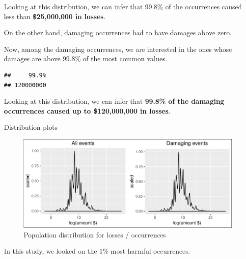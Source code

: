 \documentclass[]{article}
\begin{document}
Looking at this distribution, we can infer that 99.8\% of the
occurrences caused less than \textbf{\$25,000,000 in losses}.

On the other hand, damaging occurrences had to have damages above zero.

Now, among the damaging occurrences, we are interested in the ones whose
damages are above 99.8\% of the most common values.

\begin{verbatim}
##     99.9% 
## 120000000
\end{verbatim}

Looking at this distribution, we can infer that \textbf{99.8\% of the
damaging occurrences caused up to \$120,000,000 in losses}.

Distribution plots

\begin{figure}[h!]
\centering
\includegraphics{readme_files/figure-latex/crop-distribution-1.pdf}
\caption{Population distribution for losses / occurrences}
\end{figure}

In this study, we looked on the 1\% most harmful occurrences.
\end{document}
